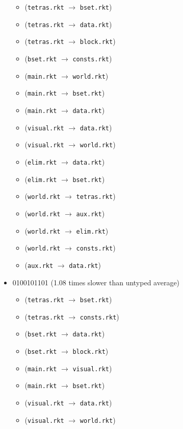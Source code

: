\documentclass{article}
\newcommand{\mono}[1]{\texttt{#1}}
\begin{document}
\begin{itemize}
  \begin{itemize}
  \item (\mono{tetras.rkt} $\rightarrow$ \mono{bset.rkt})
  \item (\mono{tetras.rkt} $\rightarrow$ \mono{data.rkt})
  \item (\mono{tetras.rkt} $\rightarrow$ \mono{block.rkt})
  \item (\mono{bset.rkt} $\rightarrow$ \mono{consts.rkt})
  \item (\mono{main.rkt} $\rightarrow$ \mono{world.rkt})
  \item (\mono{main.rkt} $\rightarrow$ \mono{bset.rkt})
  \item (\mono{main.rkt} $\rightarrow$ \mono{data.rkt})
  \item (\mono{visual.rkt} $\rightarrow$ \mono{data.rkt})
  \item (\mono{visual.rkt} $\rightarrow$ \mono{world.rkt})
  \item (\mono{elim.rkt} $\rightarrow$ \mono{data.rkt})
  \item (\mono{elim.rkt} $\rightarrow$ \mono{bset.rkt})
  \item (\mono{world.rkt} $\rightarrow$ \mono{tetras.rkt})
  \item (\mono{world.rkt} $\rightarrow$ \mono{aux.rkt})
  \item (\mono{world.rkt} $\rightarrow$ \mono{elim.rkt})
  \item (\mono{world.rkt} $\rightarrow$ \mono{consts.rkt})
  \item (\mono{aux.rkt} $\rightarrow$ \mono{data.rkt})
  \end{itemize}
\item 0100101101 (1.08 times slower than untyped average)
  \begin{itemize}
  \item (\mono{tetras.rkt} $\rightarrow$ \mono{bset.rkt})
  \item (\mono{tetras.rkt} $\rightarrow$ \mono{consts.rkt})
  \item (\mono{bset.rkt} $\rightarrow$ \mono{data.rkt})
  \item (\mono{bset.rkt} $\rightarrow$ \mono{block.rkt})
  \item (\mono{main.rkt} $\rightarrow$ \mono{visual.rkt})
  \item (\mono{main.rkt} $\rightarrow$ \mono{bset.rkt})
  \item (\mono{visual.rkt} $\rightarrow$ \mono{data.rkt})
  \item (\mono{visual.rkt} $\rightarrow$ \mono{world.rkt})

\end{itemize}
\end{itemize}
\end{document}
